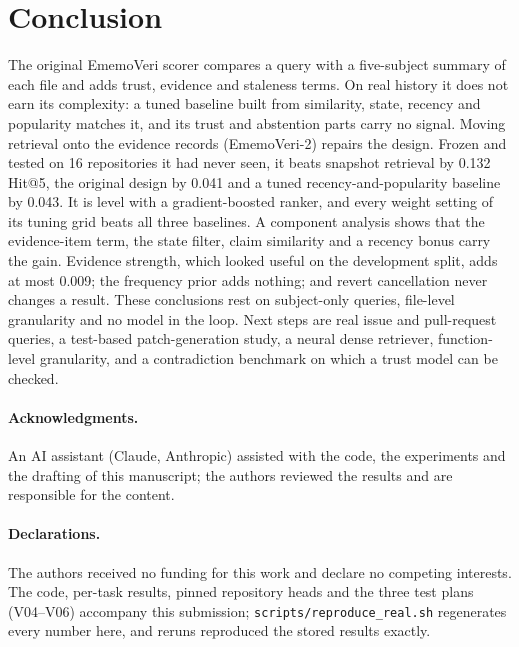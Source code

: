 \documentclass[conference]{IEEEtran}
\newcommand{\sys}{EmemoVeri}
\begin{document}
\section{Conclusion}
The original \sys{} scorer compares a query with a five-subject summary of each file and adds trust, evidence and staleness terms. On real history it does not earn its complexity: a tuned baseline built from similarity, state, recency and popularity matches it, and its trust and abstention parts carry no signal. Moving retrieval onto the evidence records (\sys{}-2) repairs the design. Frozen and tested on 16 repositories it had never seen, it beats snapshot retrieval by 0.132 Hit@5, the original design by 0.041 and a tuned recency-and-popularity baseline by 0.043. It is level with a gradient-boosted ranker, and every weight setting of its tuning grid beats all three baselines. A component analysis shows that the evidence-item term, the state filter, claim similarity and a recency bonus carry the gain. Evidence strength, which looked useful on the development split, adds at most 0.009; the frequency prior adds nothing; and revert cancellation never changes a result. These conclusions rest on subject-only queries, file-level granularity and no model in the loop. Next steps are real issue and pull-request queries, a test-based patch-generation study, a neural dense retriever, function-level granularity, and a contradiction benchmark on which a trust model can be checked.

\paragraph{Acknowledgments.} An AI assistant (Claude, Anthropic) assisted with the code, the experiments and the drafting of this manuscript; the authors reviewed the results and are responsible for the content.

\paragraph{Declarations.} The authors received no funding for this work and declare no competing interests. The code, per-task results, pinned repository heads and the three test plans (V04--V06) accompany this submission; \texttt{scripts/reproduce\_real.sh} regenerates every number here, and reruns reproduced the stored results exactly.



\end{document}
